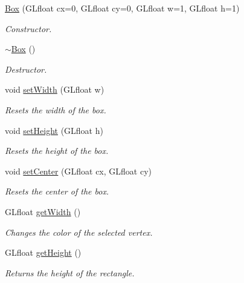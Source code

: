 \begin{DoxyCompactItemize}
\item 
\hyperlink{class_box_a60ab766bbad3c0e5abe69b50cb3fe6ed}{Box} (G\+Lfloat cx=0, G\+Lfloat cy=0, G\+Lfloat w=1, G\+Lfloat h=1)
\begin{DoxyCompactList}\small\item\em Constructor. \end{DoxyCompactList}\item 
\hyperlink{class_box_a6a5e09398e85d602a046b429062fb9c2}{$\sim$\+Box} ()
\begin{DoxyCompactList}\small\item\em Destructor. \end{DoxyCompactList}\item 
void \hyperlink{class_box_a272734cc296e7b34a53efc6f06336b00}{set\+Width} (G\+Lfloat w)
\begin{DoxyCompactList}\small\item\em Resets the width of the box. \end{DoxyCompactList}\item 
void \hyperlink{class_box_ac5556af3ef01d51abbf22d98c6c5880c}{set\+Height} (G\+Lfloat h)
\begin{DoxyCompactList}\small\item\em Resets the height of the box. \end{DoxyCompactList}\item 
void \hyperlink{class_box_a0f33ff4b10edd0fe29ebd65087842610}{set\+Center} (G\+Lfloat cx, G\+Lfloat cy)
\begin{DoxyCompactList}\small\item\em Resets the center of the box. \end{DoxyCompactList}\item 
G\+Lfloat \hyperlink{class_box_a02d15c0149fb43c84c831142697ebc6f}{get\+Width} ()
\begin{DoxyCompactList}\small\item\em Changes the color of the selected vertex. \end{DoxyCompactList}\item 
\mbox{\label{class_box_ab4283a4e09faa73b25e32a5942377a4e}} 
G\+Lfloat \hyperlink{class_box_ab4283a4e09faa73b25e32a5942377a4e}{get\+Height} ()
\begin{DoxyCompactList}\small\item\em Returns the height of the rectangle. \end{DoxyCompactList}\item 

\end{DoxyCompactItemize}
